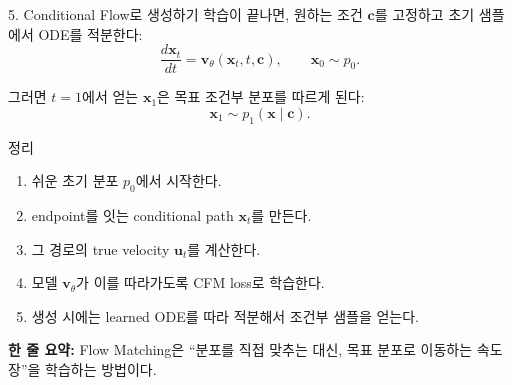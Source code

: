 \documentclass[aspectratio=169,11pt]{beamer}
\newcommand{\vx}{\mathbf{x}}
\newcommand{\vu}{\mathbf{u}}
\newcommand{\vv}{\mathbf{v}}
\begin{document}
\begin{frame}{5. Conditional Flow로 생성하기}
\small
학습이 끝나면, 원하는 조건 $\mathbf{c}$를 고정하고 초기 샘플에서 ODE를 적분한다:
\[
\frac{d\vx_t}{dt} = \vv_\theta(\vx_t,t,\mathbf{c}),
\qquad
\vx_0 \sim p_0.
\]

그러면 $t=1$에서 얻는 $\vx_1$은 목표 조건부 분포를 따르게 된다:
\[
\vx_1 \sim p_1(\vx \mid \mathbf{c}).
\]

\begin{block}{정리}
\begin{enumerate}
  \item 쉬운 초기 분포 $p_0$에서 시작한다.
  \item endpoint를 잇는 conditional path $\vx_t$를 만든다.
  \item 그 경로의 true velocity $\vu_t$를 계산한다.
  \item 모델 $\vv_\theta$가 이를 따라가도록 CFM loss로 학습한다.
  \item 생성 시에는 learned ODE를 따라 적분해서 조건부 샘플을 얻는다.
\end{enumerate}
\end{block}

\vspace{0.2em}
\textbf{한 줄 요약:} Flow Matching은 ``분포를 직접 맞추는 대신, 목표 분포로 이동하는 속도장''을 학습하는 방법이다.
\end{frame}
\end{document}
